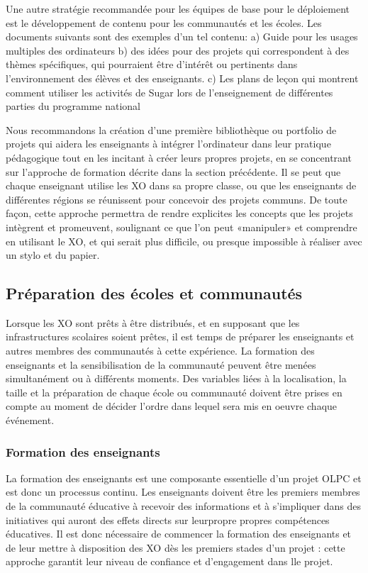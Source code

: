 \documentclass[12pt]{article}
\begin{document}
Une autre stratégie recommandée pour les équipes de base pour le
déploiement est le développement de contenu pour les communautés et les
écoles. Les documents suivants sont des exemples d'un tel contenu: a) Guide
pour les usages multiples des ordinateurs b) des idées pour des projets qui
correspondent à des thèmes spécifiques, qui pourraient être d'intérêt ou
pertinents dans l'environnement des élèves et des enseignants. c) Les plans
de leçon qui montrent comment utiliser les activités de Sugar lors de
l'enseignement de différentes parties du programme national

Nous recommandons la création d'une première bibliothèque ou portfolio de
projets qui aidera les enseignants à intégrer l'ordinateur dans leur
pratique pédagogique tout en les incitant à créer leurs propres projets, en
se concentrant sur l'approche de formation décrite dans la section
précédente. Il se peut que chaque enseignant utilise les XO dans sa propre
classe, ou que les enseignants de différentes régions se réunissent pour
concevoir des projets communs. De toute façon, cette approche permettra de
rendre explicites les concepts que les projets intègrent et promeuvent,
soulignant ce que l'on peut «manipuler» et comprendre en utilisant le XO,
et qui serait plus difficile, ou presque  impossible à réaliser avec un
stylo et du papier.
\subsection{Préparation des écoles et communautés}
\label{sec-9-3}



Lorsque les XO sont prêts à être distribués, et en supposant que les
infrastructures scolaires soient prêtes, il est temps de préparer les
enseignants et autres membres des communautés à cette expérience. La
formation des enseignants et la sensibilisation de la communauté peuvent
être menées  simultanément ou à différents moments. Des variables liées à
la localisation, la taille et la préparation de chaque école ou communauté
doivent être prises en compte au moment de décider l'ordre dans lequel sera
mis en oeuvre chaque événement.
\subsubsection{Formation des enseignants}
\label{sec-9-3-1}




La formation des enseignants est une composante essentielle d'un projet
OLPC et est donc un processus continu. Les enseignants doivent être les
premiers membres de la communauté éducative à recevoir des informations et
à s'impliquer dans des initiatives qui auront des effets directs sur
leurpropre propres compétences éducatives. Il est donc nécessaire de
commencer la formation des enseignants et de leur mettre à disposition des
XO dès les premiers stades d'un projet : cette approche garantit leur
niveau de confiance et d'engagement dans lle projet. 
\end{document}
